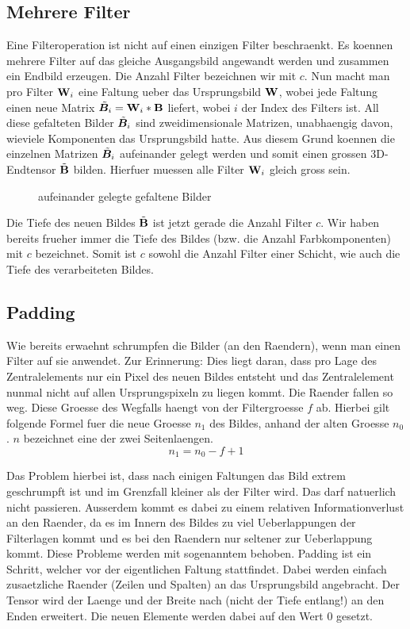 \subsection{Mehrere Filter}
Eine Filteroperation ist nicht auf einen einzigen Filter beschraenkt. Es koennen
mehrere Filter auf das gleiche Ausgangsbild angewandt werden und zusammen ein
Endbild erzeugen.
\para{}
Die Anzahl Filter bezeichnen wir mit $c$.
Nun macht man pro Filter $\mathbf{W}_i$ eine Faltung ueber das Ursprungsbild $\mathbf{W}$, wobei
jede Faltung einen neue Matrix $\tilde{\bm{B}}_i = \mathbf{W}_i * \mathbf{B}$ liefert, wobei $i$ der Index des
Filters ist. All diese gefalteten Bilder $\tilde{\bm{B}}_i$ sind zweidimensionale Matrizen, unabhaengig davon, wieviele
Komponenten das Ursprungsbild hatte. Aus diesem Grund koennen die einzelnen
Matrizen $\tilde{\bm{B}}_i$ aufeinander gelegt werden und somit einen grossen 3D-Endtensor
$\tilde{\mathbf{B}}$ bilden.
Hierfuer muessen alle Filter $\mathbf{W}_i$ gleich gross sein.
\begin{figure}[h!]
  \caption{aufeinander gelegte gefaltene Bilder}

\end{figure}
Die Tiefe des neuen Bildes $\tilde{\mathbf{B}}$ ist jetzt gerade die Anzahl Filter $c$.
Wir haben bereits frueher immer die Tiefe des Bildes (bzw. die Anzahl
Farbkomponenten) mit $c$ bezeichnet. Somit ist $c$ sowohl die Anzahl Filter
einer Schicht, wie auch die Tiefe des verarbeiteten Bildes.

\para{}
\cite{Goodfellow-et-al-2016}
\cite{deeplearning.ai:cnn}

\subsection{Padding}
Wie bereits erwaehnt schrumpfen die Bilder (an den Raendern), wenn man einen Filter auf sie anwendet.
Zur Erinnerung: Dies liegt daran, dass pro Lage des Zentralelements nur ein Pixel
des neuen Bildes entsteht und das Zentralelement nunmal nicht auf allen
Ursprungspixeln zu liegen kommt. Die Raender fallen so weg. Diese Groesse des
Wegfalls haengt von der Filtergroesse $f$ ab. Hierbei gilt folgende Formel fuer die
neue Groesse $n_1$ des Bildes, anhand der alten Groesse $n_0$. $n$ bezeichnet
eine der zwei Seitenlaengen.
\begin{equation}
  n_1 = n_0 - f + 1
\end{equation}

Das Problem hierbei ist, dass nach einigen Faltungen das Bild extrem geschrumpft
ist und im Grenzfall kleiner als der Filter wird. Das darf natuerlich nicht
passieren. Ausserdem kommt es dabei zu einem relativen Informationverlust an den Raender, da es im
Innern des Bildes zu viel Ueberlappungen der Filterlagen kommt und es bei den
Raendern nur seltener zur Ueberlappung kommt.
\para{}
Diese Probleme werden mit sogenanntem  behoben. Padding ist ein
Schritt, welcher vor der eigentlichen Faltung stattfindet. Dabei werden einfach
zusaetzliche Raender (Zeilen und Spalten) an das Ursprungsbild angebracht. Der
Tensor wird der Laenge und der Breite nach (nicht der Tiefe entlang!) an den Enden erweitert. Die neuen Elemente werden dabei auf den Wert
$0$ gesetzt.

